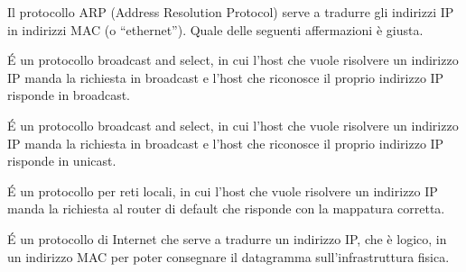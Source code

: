\question[1]
Il protocollo ARP (Address Resolution Protocol) serve a tradurre gli indirizzi IP in indirizzi MAC (o \enquote{ethernet}). %
Quale delle seguenti affermazioni è giusta.

\begin{checkboxes}
	\choice \'E un protocollo broadcast and select, in cui l'host che vuole risolvere un indirizzo IP manda la richiesta in broadcast e l'host che riconosce il proprio indirizzo IP risponde in broadcast.

	\CorrectChoice \'E un protocollo broadcast and select, in cui l'host che vuole risolvere un indirizzo IP manda la richiesta in broadcast e l'host che riconosce il proprio indirizzo IP risponde in unicast.

	\choice \'E un protocollo per reti locali, in cui l'host che vuole risolvere un indirizzo IP manda la richiesta al router di default che risponde con la mappatura corretta.

	\choice \'E un protocollo di Internet che serve a tradurre un indirizzo IP, che è logico, in un indirizzo MAC per poter consegnare il datagramma sull'infrastruttura fisica.
\end{checkboxes}
